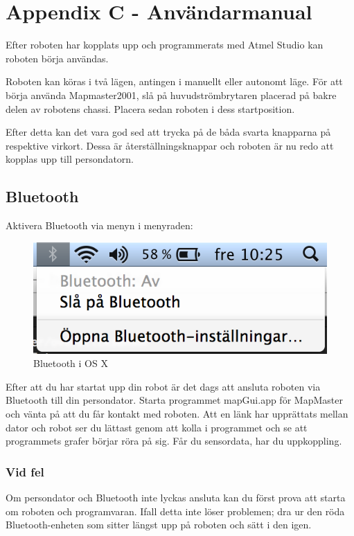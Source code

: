 \documentclass[a4paper,12pt,fleqn]{article}
\begin{document}
\section*{Appendix C - Användarmanual}
Efter roboten har kopplats upp och programmerats med Atmel Studio kan roboten börja användas. 

Roboten kan köras i två lägen, antingen i manuellt eller autonomt läge. För att börja använda Mapmaster2001, slå på huvudströmbrytaren placerad på bakre delen av robotens chassi. Placera sedan roboten i dess startposition. 

Efter detta kan det vara god sed att trycka på de båda svarta knapparna på respektive virkort. Dessa är återställningsknappar och roboten är nu redo att kopplas upp till persondatorn. 

\subsection*{Bluetooth}
Aktivera Bluetooth via menyn i menyraden: 

\begin{figure}[htp] %
  \begin{center}
  \includegraphics[keepaspectratio=true,width=0.3\linewidth]{bilder/bluetooth.png}  %
  \end{center}
  \caption{Bluetooth i OS X} %
  \label{fig:bluetooth}
\end{figure}

Efter att du har startat upp din robot är det dags att ansluta roboten via Bluetooth till din persondator. Starta programmet mapGui.app för MapMaster och vänta på att du får kontakt med roboten. Att en länk har upprättats mellan dator och robot ser du lättast genom att kolla i programmet och se att programmets grafer börjar röra på sig. Får du sensordata, har du uppkoppling. 

\subsubsection*{Vid fel}
Om persondator och Bluetooth inte lyckas ansluta kan du först prova att starta om roboten och programvaran. Ifall detta inte löser problemen; dra ur den röda Bluetooth-enheten som sitter längst upp på roboten och sätt i den igen. 
\end{document}
